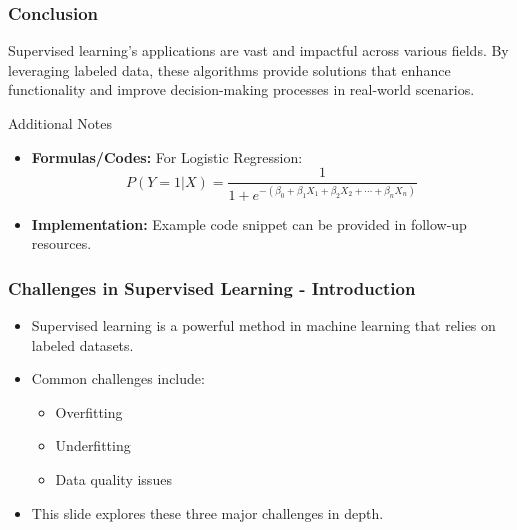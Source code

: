 \documentclass[aspectratio=169]{beamer}
\begin{document}
\begin{frame}[fragile]
    \frametitle{Conclusion}
    Supervised learning's applications are vast and impactful across various fields. By leveraging labeled data, these algorithms provide solutions that enhance functionality and improve decision-making processes in real-world scenarios.
    \begin{block}{Additional Notes}
        \begin{itemize}
            \item \textbf{Formulas/Codes:} For Logistic Regression:
            \begin{equation}
                P(Y=1 | X) = \frac{1}{1 + e^{-(\beta_0 + \beta_1 X_1 + \beta_2 X_2 + \cdots + \beta_n X_n)}}
            \end{equation}
            \item \textbf{Implementation:} Example code snippet can be provided in follow-up resources.
        \end{itemize}
    \end{block}
\end{frame}

\begin{frame}[fragile]
    \frametitle{Challenges in Supervised Learning - Introduction}
    \begin{itemize}
        \item Supervised learning is a powerful method in machine learning that relies on labeled datasets.
        \item Common challenges include:
        \begin{itemize}
            \item Overfitting
            \item Underfitting
            \item Data quality issues
        \end{itemize}
        \item This slide explores these three major challenges in depth.
    \end{itemize}
\end{frame}
\end{document}
